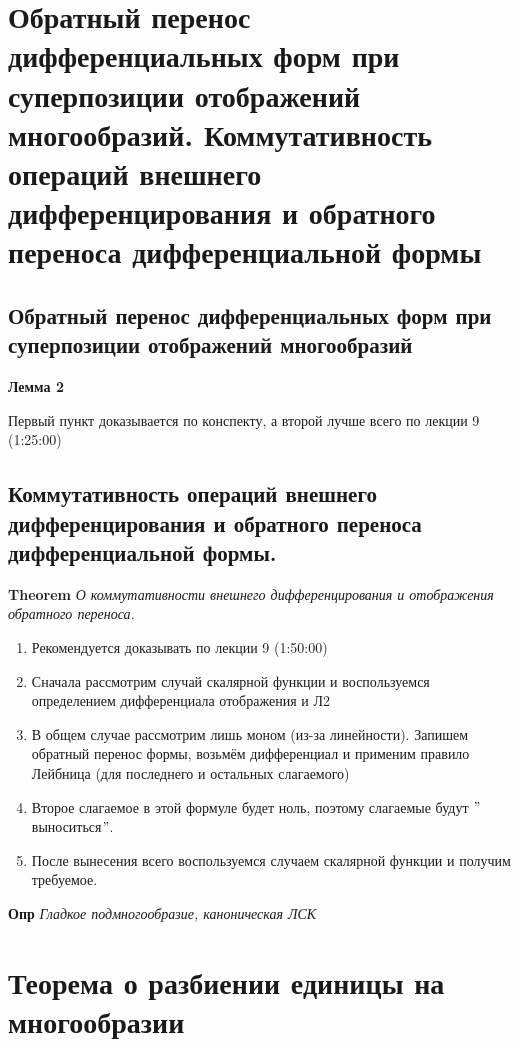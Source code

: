 \documentclass[a4paper, 14pt]{article}
\begin{document}
    \section{Обратный перенос дифференциальных форм при суперпозиции отображений многообразий.
    Коммутативность операций внешнего дифференцирования и обратного переноса дифференциальной формы}
    
    \subsection{Обратный перенос дифференциальных форм при суперпозиции отображений многообразий}
    
    \textbf{Лемма 2}
    
    Первый пункт доказывается по конспекту, а второй лучше всего по лекции 9 (1:25:00)
    
    \subsection{Коммутативность операций внешнего дифференцирования и обратного переноса дифференциальной формы.}
    
    \textbf{Theorem} \textit{О коммутативности внешнего дифференцирования и отображения обратного переноса.}
    
    \begin{enumerate}
        \item Рекомендуется доказывать по лекции 9 (1:50:00)
        \item Сначала рассмотрим случай скалярной функции и воспользуемся определением дифференциала отображения и Л2
        \item В общем случае рассмотрим лишь моном (из-за линейности).
        Запишем обратный перенос формы, возьмём дифференциал и применим правило Лейбница (для последнего и остальных
        слагаемого)
        \item Второе слагаемое в этой формуле будет ноль, поэтому слагаемые будут \("\)выноситься\("\).
        \item После вынесения всего воспользуемся случаем скалярной функции и получим требуемое.
    \end{enumerate}
    
    \textbf{Опр} \textit{Гладкое подмногообразие, каноническая ЛСК}
    
    \section{Теорема о разбиении единицы на многообразии}
    
\end{document}
